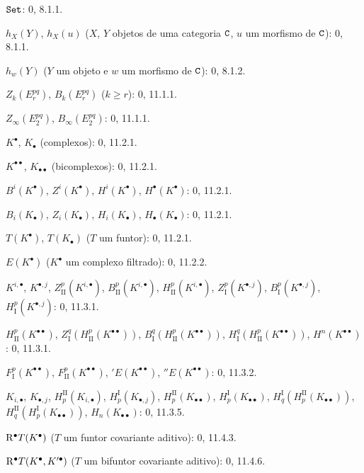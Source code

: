 \begin{flushleft}
$\mathtt{Set}$: 0, 8.1.1.

$h_X(Y)$, $h_X(u)$ ($X$, $Y$ objetos de uma categoria $\mathtt{C}$, $u$ um morfismo
de $\mathtt{C}$): 0, 8.1.1.

$h_w(Y)$ ($Y$ um objeto e $w$ um morfismo de $\mathtt{C}$): 0, 8.1.2.

$Z_k(E_r^{pq})$, $B_k(E_r^{pq})$ ($k\geq r$): 0, 11.1.1.

$Z_\infty(E_2^{pq})$, $B_\infty(E_2^{pq})$: 0, 11.1.1.

$K^\bullet$, $K_\bullet$ (complexos): 0, 11.2.1.

$K^{\bullet\bullet}$, $K_{\bullet\bullet}$ (bicomplexos): 0, 11.2.1.

$B^i(K^\bullet)$, $Z^i(K^\bullet)$, $H^i(K^\bullet)$,
$H^\bullet(K^\bullet)$: 0, 11.2.1.

$B_i(K_\bullet)$, $Z_i(K_\bullet)$, $H_i(K_\bullet)$,
$H_\bullet(K_\bullet)$: 0, 11.2.1.

$T(K^\bullet)$, $T(K_\bullet)$ ($T$ um funtor): 0, 11.2.1.

$E(K^\bullet)$ ($K^\bullet$ um complexo filtrado): 0, 11.2.2.

$K^{i,\bullet}$, $K^{\bullet,j}$, $Z_{\mathrm{II}}^p(K^{i,\bullet})$,
$B_{\mathrm{II}}^p(K^{i,\bullet})$, $H_{\mathrm{II}}^p(K^{i,\bullet})$,
$Z_{\mathrm I}^p(K^{\bullet,j})$, $B_{\mathrm I}^p(K^{\bullet,j})$,
$H_{\mathrm I}^p(K^{\bullet,j})$: 0, 11.3.1.

$H_{\mathrm{II}}^p(K^{\bullet\bullet})$,
$Z_{\mathrm I}^q(H_{\mathrm{II}}^p(K^{\bullet\bullet}))$,
$B_{\mathrm I}^q(H_{\mathrm{II}}^p(K^{\bullet\bullet}))$,
$H_{\mathrm I}^q(H_{\mathrm{II}}^p(K^{\bullet\bullet}))$,
$H^n(K^{\bullet\bullet})$: 0, 11.3.1.

$F_{\mathrm I}^p(K^{\bullet\bullet})$,
$F_{\mathrm{II}}^p(K^{\bullet\bullet})$, ${}'E(K^{\bullet\bullet})$,
${}''E(K^{\bullet\bullet})$: 0, 11.3.2.

$K_{i,\bullet}$, $K_{\bullet,j}$, $H_p^{\mathrm{II}}(K_{i,\bullet})$,
$H_p^{\mathrm I}(K_{\bullet,j})$, $H_p^{\mathrm{II}}(K_{\bullet\bullet})$,
$H_p^{\mathrm I}(K_{\bullet\bullet})$,
$H_q^{\mathrm I}(H_p^{\mathrm{II}}(K_{\bullet\bullet}))$,
$H_q^{\mathrm{II}}(H_p^{\mathrm I}(K_{\bullet\bullet}))$,
$H_n(K_{\bullet\bullet})$: 0, 11.3.5.

$\mathrm{R}^\bullet T(K^\bullet)$ ($T$ um funtor covariante aditivo): 0, 11.4.3.

$\mathrm{R}^\bullet T(K^\bullet,K'^{\bullet})$ ($T$ um bifuntor covariante
aditivo): 0, 11.4.6.


\end{flushleft}
